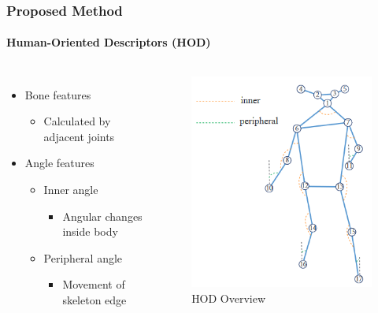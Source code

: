 \documentclass[
	12pt, %
	aspectratio=169, %
]{beamer}
\begin{document}
\begin{frame}
	\frametitle{Proposed Method}
	\framesubtitle{Human-Oriented Descriptors (HOD)}
	
	\begin{columns}
		\begin{itemize}
			\item Bone features
			\begin{itemize}
				\item Calculated by adjacent joints
			\end{itemize}
			\item Angle features
			\begin{itemize}
				\item Inner angle
				\begin{itemize}
					\item Angular changes inside body
				\end{itemize}
				\item Peripheral angle
				\begin{itemize}
					\item Movement of skeleton edge
				\end{itemize}
			\end{itemize}
		\end{itemize}
		\begin{figure}
			\centering
			\includegraphics[width=0.65\linewidth]{"./Images/hod.png"}
			\caption{HOD Overview}
		\end{figure}
	\end{columns}

\end{frame}
\end{document}
